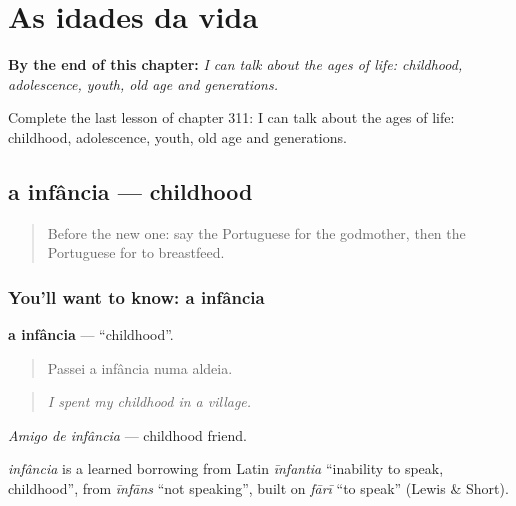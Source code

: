 
\chapter{As idades da vida}
\label{ch:pt-as-idades-da-vida}

\begin{chapteropening}
\textbf{By the end of this chapter:} \emph{I can talk about the ages of life: childhood, adolescence, youth, old age and generations.}

Complete the last lesson of chapter 311: I can talk about the ages of life: childhood, adolescence, youth, old age and generations.
\end{chapteropening}

\section[a infância]{a infância — childhood}

\label{lesson:PT-C311-infancia}



\begin{quote}
Before the new one: say the Portuguese for the godmother, then the Portuguese for to breastfeed.
\end{quote}

\subsection*{You'll want to know: a infância}
\textbf{a infância} — \textquotedblleft{}childhood\textquotedblright{}.

\begin{quote}
Passei a infância numa aldeia.
\end{quote}

\begin{quote}
\emph{I spent my childhood in a village.}
\end{quote}

\emph{Amigo de infância} — childhood friend.

\begin{cousinweb}
\emph{infância} is a learned borrowing from Latin \emph{īnfantia} \textquotedblleft{}inability to speak, childhood\textquotedblright{}, from \emph{īnfāns} \textquotedblleft{}not speaking\textquotedblright{}, built on \emph{fārī} \textquotedblleft{}to speak\textquotedblright{} (Lewis \& Short).
\end{cousinweb}

